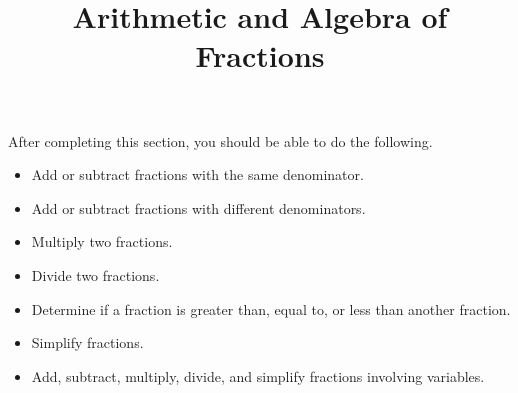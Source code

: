 \documentclass{ximera}
\title{Arithmetic and Algebra of Fractions}
\begin{document}
\begin{abstract} 
\end{abstract}

\maketitle

\begin{sectionOutcomes}
After completing this section, you should be able to do the following.

\begin{itemize}
	\item Add or subtract fractions with the same denominator.
    \item Add or subtract fractions with different denominators. 
    \item Multiply two fractions.
    \item Divide two fractions.
    \item Determine if a fraction is greater than, equal to, or less than another fraction.
    \item Simplify fractions. 
    \item Add, subtract, multiply, divide, and simplify fractions involving variables.

\end{itemize}
\end{sectionOutcomes}
\end{document}
